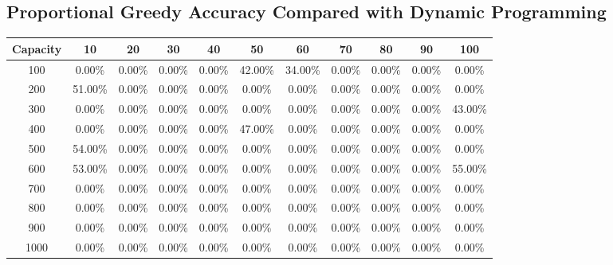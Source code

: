 \documentclass{article}
\begin{document}
\subsection{Proportional Greedy Accuracy Compared with Dynamic Programming}
\begin{center}
\begin{tabular}{ccccccccccc}
\toprule
Capacity & 10 & 20 & 30 & 40 & 50 & 60 & 70 & 80 & 90 & 100 \\
\midrule
100 & 0.00\% & 0.00\% & 0.00\% & 0.00\% & 42.00\% & 34.00\% & 0.00\% & 0.00\% & 0.00\% & 0.00\% \\
200 & 51.00\% & 0.00\% & 0.00\% & 0.00\% & 0.00\% & 0.00\% & 0.00\% & 0.00\% & 0.00\% & 0.00\% \\
300 & 0.00\% & 0.00\% & 0.00\% & 0.00\% & 0.00\% & 0.00\% & 0.00\% & 0.00\% & 0.00\% & 43.00\% \\
400 & 0.00\% & 0.00\% & 0.00\% & 0.00\% & 47.00\% & 0.00\% & 0.00\% & 0.00\% & 0.00\% & 0.00\% \\
500 & 54.00\% & 0.00\% & 0.00\% & 0.00\% & 0.00\% & 0.00\% & 0.00\% & 0.00\% & 0.00\% & 0.00\% \\
600 & 53.00\% & 0.00\% & 0.00\% & 0.00\% & 0.00\% & 0.00\% & 0.00\% & 0.00\% & 0.00\% & 55.00\% \\
700 & 0.00\% & 0.00\% & 0.00\% & 0.00\% & 0.00\% & 0.00\% & 0.00\% & 0.00\% & 0.00\% & 0.00\% \\
800 & 0.00\% & 0.00\% & 0.00\% & 0.00\% & 0.00\% & 0.00\% & 0.00\% & 0.00\% & 0.00\% & 0.00\% \\
900 & 0.00\% & 0.00\% & 0.00\% & 0.00\% & 0.00\% & 0.00\% & 0.00\% & 0.00\% & 0.00\% & 0.00\% \\
1000 & 0.00\% & 0.00\% & 0.00\% & 0.00\% & 0.00\% & 0.00\% & 0.00\% & 0.00\% & 0.00\% & 0.00\% \\
\bottomrule
\end{tabular}
\end{center}
\end{document}
